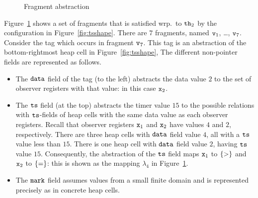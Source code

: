 \begin{figure}
\center
	
\caption{Fragment abstraction}
\label{fig:tsviewshape}
\end{figure} 

Figure~\ref{fig:tsviewshape} shows a set of fragments that is
satisfied wrp.\ to ${\tt th}_2$ by the configuration in Figure~\ref{fig:tsshape}.
There are $7$ fragments, named $\mathtt{v}_1$, \ldots , $\mathtt{v}_7$.
Consider the tag which occurs in fragment $\mathtt{v}_7$.
This tag is an abstraction of the
bottom-rightmost heap cell in Figure~\ref{fig:tsshape},
The different non-pointer fields are represented as follows.
\begin{itemize}
\item The $\tt data$ field of the tag (to the left) abstracts the data value
  $2$ to the set of observer registers with that value: in this case
  $\mathtt{x}_2$.
\item The $\tt ts$ field (at the top) abstracts the timer value $15$ to
  the possible relations with $\tt ts$-fields of heap cells with the same
  data value as each observer registers. Recall that observer registers
  $\mathtt{x}_1$ and $\mathtt{x}_2$ have values $4$ and $2$, respectively. There are
  three heap cells with $\tt data$ field value $4$, all with a $\tt ts$
  value less than $15$. There is one heap cell with
  $\tt data$ field value $2$, having $\tt ts$ value $15$.
  Consequently, the abstraction of the $\tt ts$ field maps $\mathtt{x}_1$ to
  $\left\{>\right\}$ and $\mathtt{x}_2$ to $\left\{=\right\}$: this is shown as the mapping
  $\lambda_4$ in Figure~\ref{fig:tsviewshape}.
\item The $\tt mark$ field assumes values from a small finite domain and
  is represented precisely as in concrete heap cells.
\end{itemize}

